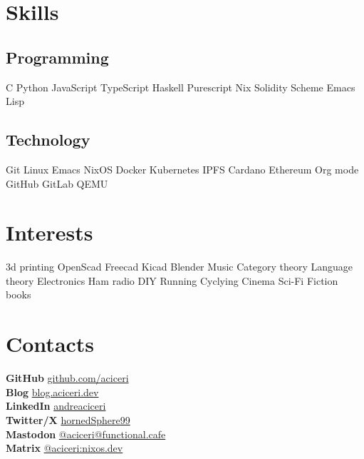\documentclass[]{cv}
\begin{document}
\begin{minipage}[t]{0.24\textwidth}



\section{Skills}
\subsection{Programming}
\textbullet{} C
\textbullet{} Python
\textbullet{} JavaScript
\textbullet{} TypeScript
\textbullet{} Haskell
\textbullet{} Purescript
\textbullet{} Nix
\textbullet{} Solidity
\textbullet{} Scheme
\textbullet{} Emacs Lisp
\sectionsep

\subsection{Technology}
\textbullet{} Git
\textbullet{} Linux
\textbullet{} Emacs
\textbullet{} NixOS
\textbullet{} Docker
\textbullet{} Kubernetes
\textbullet{} IPFS
\textbullet{} Cardano
\textbullet{} Ethereum
\textbullet{} Org mode
\textbullet{} GitHub
\textbullet{} GitLab
\textbullet{} QEMU
\sectionsep

\section{Interests}
\textbullet{} 3d printing
\textbullet{} OpenScad
\textbullet{} Freecad
\textbullet{} Kicad
\textbullet{} Blender
\textbullet{} Music
\textbullet{} Category theory
\textbullet{} Language theory
\textbullet{} Electronics
\textbullet{} Ham radio
\textbullet{} DIY
\textbullet{} Running
\textbullet{} Cyclying
\textbullet{} Cinema
\textbullet{} Sci-Fi
\textbullet{} Fiction books

\sectionsep


\section{Contacts}
{\bf GitHub} \textrm{\href{https://github.com/}{github.com/aciceri}} \\
{\bf Blog} \href{https://blog.aciceri.dev}{blog.aciceri.dev} \\
{\bf LinkedIn} \href{https://www.linkedin.com/}{andreaciceri} \\
{\bf Twitter/X} \href{https://x.com/hornedSphere99}{hornedSphere99} \\
{\bf Mastodon} \href{https://functional.cafe/@aciceri}{@aciceri@functional.cafe} \\
{\bf Matrix} \href{https://matrix.to/#/@aciceri:nixos.dev}{@aciceri:nixos.dev}
\sectionsep

\end{minipage}
\end{document}
